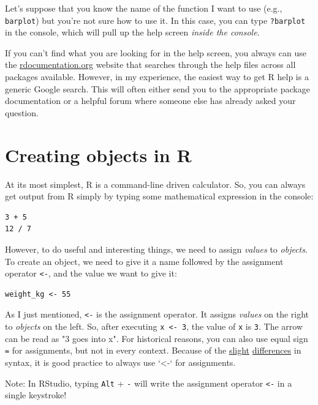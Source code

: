 \documentclass[11pt]{article}
\begin{document}
Let's suppose that you know the name of the function I want to use (e.g., \texttt{barplot}) but you're not sure how to use it.  In this case, you can type \texttt{?barplot} in the console, which will pull up the help screen \emph{inside the console}.

If you can't find what you are looking for in the help screen, you always can use the \href{http://www.rdocumentation.org}{rdocumentation.org} website that searches through the help files across all packages available.  However, in my experience, the easiest way to get R help is a generic Google search.  This  will often either send you to the appropriate package documentation or a helpful forum where someone else has already asked your question.


\section*{Creating objects in R}
\label{sec-6}

At its most simplest, R is a command-line driven calculator.  So, you can always get output from R simply by typing some mathematical expression in the console:

\begin{verbatim}
3 + 5
12 / 7
\end{verbatim}

However, to do useful and interesting things, we need to assign \emph{values} to \emph{objects}. To create an object, we need to give it a name followed by the assignment operator \texttt{<-}, and the value we want to give it:

\begin{verbatim}
weight_kg <- 55
\end{verbatim}

As I just mentioned, \texttt{<-} is the assignment operator. It assigns \emph{values} on the right to \emph{objects} on the left. So, after executing \texttt{x <- 3}, the value of \texttt{x} is \texttt{3}. The arrow can be read as "3 goes into x".  For historical reasons, you can also use equal sign \texttt{=} for assignments, but not in every context. Because of the \href{http://blog.revolutionanalytics.com/2008/12/use-equals-or-arrow-for-assignment.html}{slight} \href{https://web.archive.org/web/20130610005305/https://stat.ethz.ch/pipermail/r-help/2009-March/191462.html}{differences} in syntax, it is good practice to always use `<-` for assignments.

Note: In RStudio, typing \texttt{Alt} + \texttt{-}  will write the assignment operator \texttt{<-} in a single keystroke!  
\end{document}
